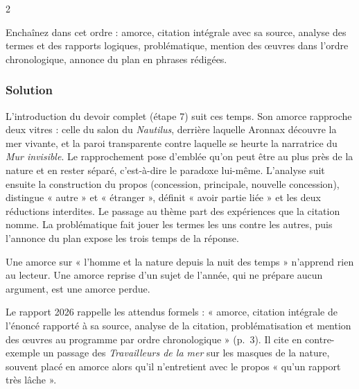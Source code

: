 \documentclass[11pt,a4paper]{article}
\begin{document}
\begin{indication}{2}

Enchaînez dans cet ordre : amorce, citation intégrale avec sa source, analyse des termes et des rapports logiques, problématique, mention des œuvres dans l'ordre chronologique, annonce du plan en phrases rédigées.

\end{indication}

\hypertarget{solution-5}{%
\subsubsection{Solution}\label{solution-5}}

L'introduction du devoir complet (étape 7) suit ces temps. Son amorce rapproche deux vitres : celle du salon du \emph{Nautilus}, derrière laquelle Aronnax découvre la mer vivante, et la paroi transparente contre laquelle se heurte la narratrice du \emph{Mur invisible}. Le rapprochement pose d'emblée qu'on peut être au plus près de la nature et en rester séparé, c'est-à-dire le paradoxe lui-même. L'analyse suit ensuite la construction du propos (concession, principale, nouvelle concession), distingue « autre » et « étranger », définit « avoir partie liée » et les deux réductions interdites. Le passage au thème part des expériences que la citation nomme. La problématique fait jouer les termes les uns contre les autres, puis l'annonce du plan expose les trois temps de la réponse.

\begin{piege}

Une amorce sur « l'homme et la nature depuis la nuit des temps » n'apprend rien au lecteur. Une amorce reprise d'un sujet de l'année, qui ne prépare aucun argument, est une amorce perdue.

\end{piege}

\begin{jury}

Le rapport 2026 rappelle les attendus formels : « amorce, citation intégrale de l'énoncé rapporté à sa source, analyse de la citation, problématisation et mention des œuvres au programme par ordre chronologique » (p.~3). Il cite en contre-exemple un passage des \emph{Travailleurs de la mer} sur les masques de la nature, souvent placé en amorce alors qu'il n'entretient avec le propos « qu'un rapport très lâche ».

\end{jury}
\end{document}
